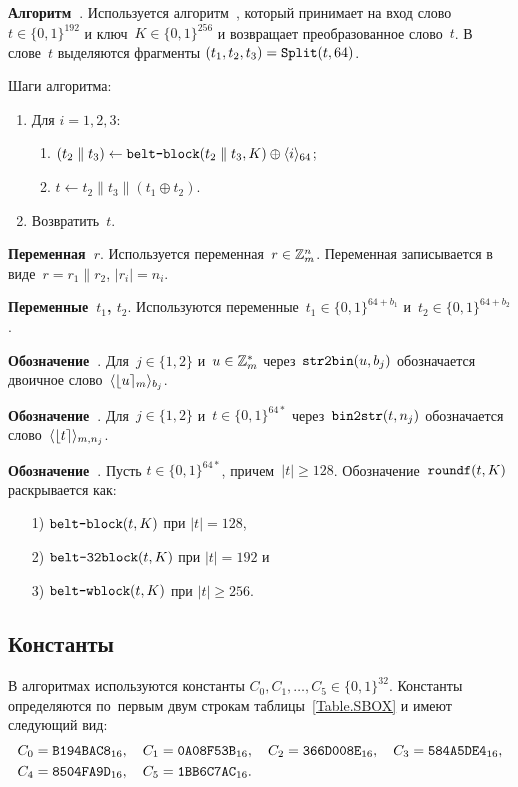 {\bf Алгоритм~}.
Используется алгоритм~,
который принимает на вход слово~$t\in\{0,1\}^{192}$ и ключ~$K\in\{0,1\}^{256}$
и возвращает преобразованное слово~$t$. В слове~$t$ выделяются 
фрагменты $(t_1,t_2,t_3)=\mathop{\texttt{Split}}\nolimits(t,64)$.

Шаги алгоритма:
\begin{enumerate}
\item
Для $i=1,2,3$:
\begin{enumerate}
\item
$(t_2\parallel t_3)\leftarrow
\texttt{belt-block}(t_2\parallel t_3,K)\oplus \langle i\rangle_{64}$; 
\item
$t\leftarrow t_2\parallel t_3\parallel(t_1\oplus t_2)$.
\end{enumerate}
\item
Возвратить~$t$.
\end{enumerate}

{\bf Переменная~$r$}.
Используется переменная~$r\in\mathbb{Z}_m^n$.
Переменная записывается в виде~$r=r_1\parallel r_2$,
$|r_i|=n_i$.

{\bf Переменные~$t_1$, $t_2$}.
Используются переменные~$t_1\in\{0,1\}^{64+b_1}$ 
и~$t_2\in\{0,1\}^{64+b_2}$.

{\bf Обозначение~}.
Для~$j\in\{1,2\}$ и~$u\in\mathbb{Z}_m^*$ через~$\texttt{str2bin}(u,b_j)$ 
обозначается двоичное слово~$\langle\lfloor u\rceil_m\rangle_{b_j}$.

{\bf Обозначение~}.
Для~$j\in\{1,2\}$ и~$t\in\{0,1\}^{64*}$ через~$\texttt{bin2str}(t,n_j)$ 
обозначается слово~$\langle\lfloor t\rceil\rangle_{m,n_j}$. 

{\bf Обозначение~}.
Пусть $t\in\{0,1\}^{64*}$, причем~$|t|\geq 128$.
Обозначение~$\texttt{roundf}(t,K)$ раскрывается как:
\begin{enumerate}
\item[1)]
$\texttt{belt-block}(t,K)$ при $|t|=128$,
\item[2)]
$\texttt{belt-32block}(t,K)$ при $|t|=192$ и
\item[3)]
$\texttt{belt-wblock}(t,K)$ при $|t|\geq 256$.
\end{enumerate}

\subsection{Константы}\label{FMT.Const}

В алгоритмах используются константы $C_0,C_1,\ldots,C_5\in\{0,1\}^{32}$.
Константы определяются по~первым двум строкам таблицы~\ref{Table.SBOX}
и имеют следующий вид:
\begin{align*}
&
C_0 = \texttt{B194BAC8}_{16},\quad
C_1 = \texttt{0A08F53B}_{16},\quad
C_2 = \texttt{366D008E}_{16},\quad
C_3 = \texttt{584A5DE4}_{16},\\
&
C_4 = \texttt{8504FA9D}_{16},\quad
C_5 = \texttt{1BB6C7AC}_{16}.
\end{align*}

